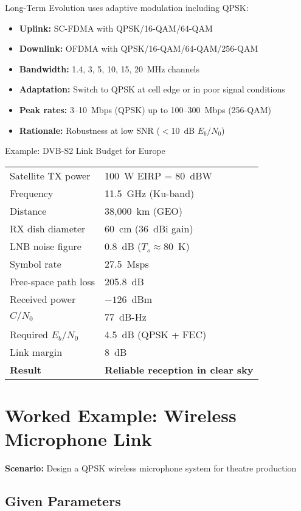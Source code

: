 Long-Term Evolution uses adaptive modulation including QPSK:
\begin{itemize}
\item \textbf{Uplink:} SC-FDMA with QPSK/16-QAM/64-QAM
\item \textbf{Downlink:} OFDMA with QPSK/16-QAM/64-QAM/256-QAM
\item \textbf{Bandwidth:} 1.4, 3, 5, 10, 15, 20~MHz channels
\item \textbf{Adaptation:} Switch to QPSK at cell edge or in poor signal conditions
\item \textbf{Peak rates:} 3--10~Mbps (QPSK) up to 100--300~Mbps (256-QAM)
\item \textbf{Rationale:} Robustness at low SNR ($<$10~dB $E_b/N_0$)
\end{itemize}

\begin{calloutbox}{Example: DVB-S2 Link Budget for Europe}
\begin{tabular}{@{}ll@{}}
Satellite TX power & 100~W EIRP = 80~dBW \\
Frequency & 11.5~GHz (Ku-band) \\
Distance & 38,000~km (GEO) \\
RX dish diameter & 60~cm (36~dBi gain) \\
LNB noise figure & 0.8~dB ($T_s \approx 80$~K) \\
Symbol rate & 27.5~Msps \\
\midrule
Free-space path loss & 205.8~dB \\
Received power & $-126$~dBm \\
$C/N_0$ & 77~dB-Hz \\
Required $E_b/N_0$ & 4.5~dB (QPSK + FEC) \\
Link margin & 8~dB \\
\midrule
\textbf{Result} & \textbf{Reliable reception in clear sky} \\
\end{tabular}
\end{calloutbox}

\section{Worked Example: Wireless Microphone Link}

\textbf{Scenario:} Design a QPSK wireless microphone system for theatre production

\subsection*{Given Parameters}

